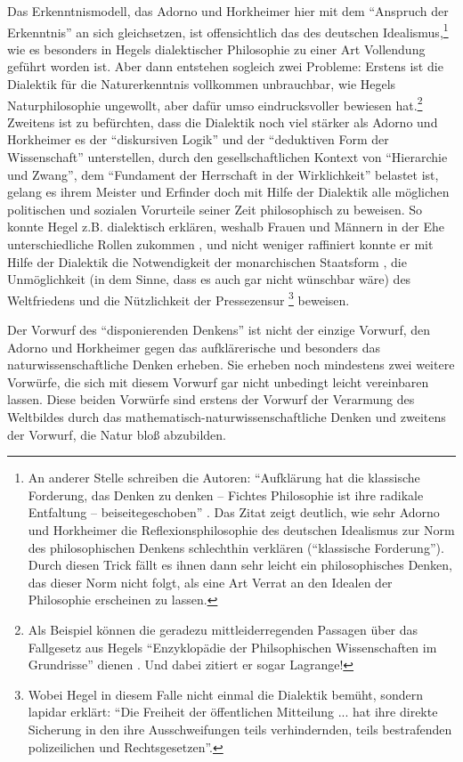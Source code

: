 \documentclass[12pt,a4paper,ngerman]{article}
\begin{document}
Das Erkenntnismodell, das Adorno und Horkheimer hier mit dem "`Anspruch der
Erkenntnis"' an sich gleichsetzen, ist offensichtlich das des deutschen
Idealismus,\footnote{An anderer Stelle schreiben die Autoren: "`Aufklärung hat
die klassische Forderung, das Denken zu denken -- Fichtes Philosophie ist ihre
radikale Entfaltung -- beiseitegeschoben"'
\cite[S. 31]{adorno-horkheimer:1947}. Das Zitat zeigt deutlich, wie sehr
Adorno und Horkheimer die Reflexionsphilosophie des deutschen Idealismus zur
Norm des philosophischen Denkens schlechthin verklären ("`klassische
Forderung"'). Durch diesen Trick fällt es ihnen dann sehr leicht ein
philosophisches Denken, das dieser Norm nicht folgt, als eine Art Verrat an
den Idealen der Philosophie erscheinen zu lassen.} wie es besonders in Hegels
dialektischer Philosophie zu einer Art Vollendung geführt worden ist. Aber
dann entstehen sogleich zwei Probleme: Erstens ist die Dialektik für die
Naturerkenntnis vollkommen unbrauchbar, wie Hegels Naturphilosophie ungewollt,
aber dafür umso eindrucksvoller bewiesen hat.\footnote{Als Beispiel können die
geradezu mittleiderregenden Passagen über das Fallgesetz aus Hegels
"`Enzyklopädie der Philsophischen Wissenschaften im Grundrisse"' dienen
\cite[§ 267, 268]{hegel:1817}. Und dabei zitiert er sogar Lagrange!} Zweitens
ist zu befürchten, dass die Dialektik noch viel stärker als Adorno und
Horkheimer es der "`diskursiven Logik"' und der "`deduktiven Form der
Wissenschaft"' unterstellen, durch den gesellschaftlichen Kontext von
"`Hierarchie und Zwang"', dem "`Fundament der Herrschaft in der Wirklichkeit"'
belastet ist, gelang es ihrem Meister und Erfinder doch mit Hilfe der
Dialektik alle möglichen politischen und sozialen Vorurteile seiner Zeit
philosophisch zu beweisen. So konnte Hegel z.B. dialektisch erklären, weshalb
Frauen und Männern in der Ehe unterschiedliche Rollen zukommen \cite[§
165,166]{hegel:1821}, und nicht weniger raffiniert konnte er mit Hilfe der
Dialektik die Notwendigkeit der monarchischen Staatsform \cite[§
279,280]{hegel:1821}, die Unmöglichkeit (in dem Sinne, dass es auch gar nicht
wünschbar wäre) des Weltfriedens \cite[§ 333, 337]{hegel:1821} und die
Nützlichkeit der Pressezensur \cite[§ 319]{hegel:1821}\footnote{Wobei Hegel in
diesem Falle nicht einmal die Dialektik bemüht, sondern lapidar erklärt: "`Die
Freiheit der öffentlichen Mitteilung ... hat ihre direkte Sicherung in den
ihre Ausschweifungen teils verhindernden, teils bestrafenden polizeilichen und
Rechtsgesetzen"'.} beweisen.

Der Vorwurf des "`disponierenden Denkens"' ist nicht der einzige Vorwurf, den
Adorno und Horkheimer gegen das aufklärerische und besonders das
naturwissenschaftliche Denken erheben. Sie erheben noch mindestens zwei
weitere Vorwürfe, die sich mit diesem Vorwurf gar nicht unbedingt leicht
vereinbaren lassen. Diese beiden Vorwürfe sind erstens der Vorwurf der
Verarmung des Weltbildes durch das mathematisch-naturwissenschaftliche Denken
und zweitens der Vorwurf, die Natur bloß abzubilden.
\end{document}
